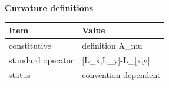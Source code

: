 \begin{center}
\textbf{Curvature definitions}\par\smallskip
\begin{tabular}{ll}
\toprule
Item & Value \\
\midrule
constitutive & definition A\_mu \\
standard operator & [L\_x,L\_y]-L\_[x,y] \\
status & convention-dependent \\
\bottomrule
\end{tabular}
\end{center}
